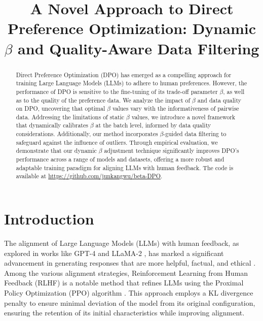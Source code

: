 \title{A Novel Approach to Direct Preference Optimization: Dynamic $\beta$ and Quality-Aware Data Filtering}



\maketitle

\begin{abstract}
Direct Preference Optimization (DPO) has emerged as a compelling approach for training Large Language Models (LLMs) to adhere to human preferences. However, the performance of DPO is sensitive to the fine-tuning of its trade-off parameter $\beta$, as well as to the quality of the preference data. We analyze the impact of $\beta$ and data quality on DPO, uncovering that optimal $\beta$ values vary with the informativeness of pairwise data. Addressing the limitations of static $\beta$ values, we introduce a novel framework that dynamically calibrates $\beta$ at the batch level, informed by data quality considerations. Additionally, our method incorporates $\beta$-guided data filtering to safeguard against the influence of outliers. Through empirical evaluation, we demonstrate that our dynamic $\beta$ adjustment technique significantly improves DPO's performance across a range of models and datasets, offering a more robust and adaptable training paradigm for aligning LLMs with human feedback. The code is available at \url{https://github.com/junkangwu/beta-DPO}.
\end{abstract}

\section{Introduction}
\label{Introduction}
The alignment of Large Language Models (LLMs) with human feedback, as explored in works like GPT-4 and LLaMA-2 \cite{GPT4,llama2,GPT4_2}, has marked a significant advancement in generating responses that are more helpful, factual, and ethical \cite{instructGPT}. Among the various alignment strategies, Reinforcement Learning from Human Feedback (RLHF) \cite{instructGPT} is a notable method that refines LLMs using the Proximal Policy Optimization (PPO) algorithm \cite{PPO}. This approach employs a KL divergence penalty to ensure minimal deviation of the model from its original configuration, ensuring the retention of its initial characteristics while improving alignment.

